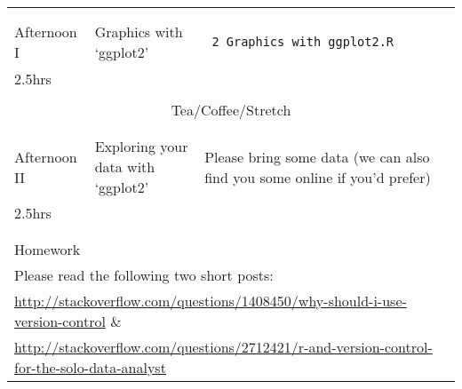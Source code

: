 \documentclass{article}[12pt]
\begin{document}
\begin{table}[h!]
\begin{tabular}{ |p{2cm}|p{4cm}|p{7cm}| }
                               &                              & \\
                               &                              & \\
Afternoon I                    & Graphics with `ggplot2'      & \begin{verbatim} 2_Graphics_with_ggplot2.R \end{verbatim} \\
2.5hrs                         &                              &  \\ \hline
\multicolumn{3}{c}{} \\
\multicolumn{3}{c}{Tea/Coffee/Stretch}  \\ 
\multicolumn{3}{c}{} \\ \hline
 & & \\
Afternoon II                   & Exploring your data with `ggplot2' & Please bring some data (we can also find you some online if you'd prefer)\\
2.5hrs                         &                              &  \\
                               &                              & \\ \hline
\hline
\multicolumn{3}{c}{} \\ 
\multicolumn{3}{l}{Homework}  \\
\multicolumn{3}{l}{Please read the following two short posts:}  \\
\multicolumn{3}{l}{\href{http://stackoverflow.com/questions/1408450/why-should-i-use-version-control}{http://stackoverflow.com/questions/1408450/why-should-i-use-version-control} \&} \\
\multicolumn{3}{l}{\href{http://stackoverflow.com/questions/2712421/r-and-version-control-for-the-solo-data-analyst}{http://stackoverflow.com/questions/2712421/r-and-version-control-for-the-solo-data-analyst}} \\
\end{tabular}
\end{table}

\clearpage
\end{document}
